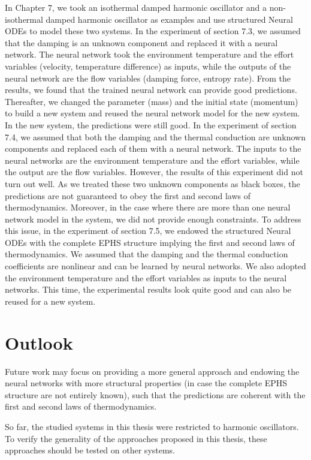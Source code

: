 \documentclass[
	parskip, 			   %
	twoside, 			   %
	DIV=14, 			   %
	BCOR=15.0mm, 		   %
	headsepline, 		   %
	open=right, 		   %
	captions=tableheading, %
	bibliography=totoc,    %
	numbers=noenddot       %
]{scrreprt}
\begin{document}
In Chapter 7, we took an isothermal damped harmonic oscillator and a non-isothermal damped harmonic oscillator as examples and use structured Neural ODEs to model these two systems. In the experiment of section 7.3, we assumed that the damping is an unknown component and replaced it with a neural network. The neural network took the environment temperature and the effort variables (velocity, temperature difference) as inputs, while the outputs of the neural network are the flow variables (damping force, entropy rate). From the results, we found that the trained neural network can provide good predictions. Thereafter, we changed the parameter (mass) and the initial state (momentum) to build a new system and reused the neural network model for the new system. In the new system, the predictions were still good. In the experiment of section 7.4, we assumed that both the damping and the thermal conduction are unknown components and replaced each of them with a neural network. The inputs to the neural networks are the environment temperature and the effort variables, while the output are the flow variables. However, the results of this experiment did not turn out well. As we treated these two unknown components as black boxes, the predictions are not guaranteed to obey the first and second laws of thermodynamics. Moreover, in the case where there are more than one neural network model in the system, we did not provide enough constraints. To address this issue, in the experiment of section 7.5, we endowed the structured Neural ODEs with the complete EPHS structure implying the first and second laws of thermodynamics. We assumed that the damping and the thermal conduction coefficients are nonlinear and can be learned by neural networks. We also adopted the environment temperature and the effort variables as inputs to the neural networks. This time, the experimental results look quite good and can also be reused for a new system.

\section{Outlook}
Future work may focus on providing a more general approach and endowing the neural networks with more structural properties (in case the complete EPHS structure are not entirely known), such that the predictions are coherent with the first and second laws of thermodynamics. 

So far, the studied systems in this thesis were restricted to harmonic oscillators. To verify the generality of the approaches proposed in this thesis, these approaches should be tested on other systems. 
\end{document}
